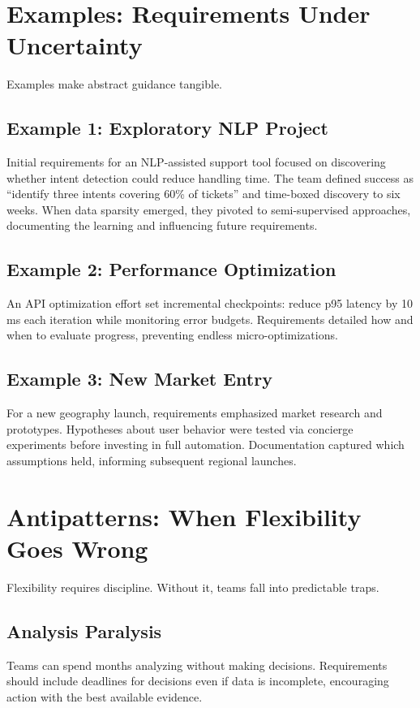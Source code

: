 \section{Examples: Requirements Under Uncertainty}
\label{sec:uncertainty-examples}

Examples make abstract guidance tangible.

\subsection{Example 1: Exploratory NLP Project}
Initial requirements for an NLP-assisted support tool focused on discovering whether intent detection could reduce handling time. The team defined success as ``identify three intents covering 60\% of tickets'' and time-boxed discovery to six weeks. When data sparsity emerged, they pivoted to semi-supervised approaches, documenting the learning and influencing future requirements.

\subsection{Example 2: Performance Optimization}
An API optimization effort set incremental checkpoints: reduce p95 latency by 10\,ms each iteration while monitoring error budgets. Requirements detailed how and when to evaluate progress, preventing endless micro-optimizations.

\subsection{Example 3: New Market Entry}
For a new geography launch, requirements emphasized market research and prototypes. Hypotheses about user behavior were tested via concierge experiments before investing in full automation. Documentation captured which assumptions held, informing subsequent regional launches.

\section{Antipatterns: When Flexibility Goes Wrong}
\label{sec:flexibility-antipatterns}

Flexibility requires discipline. Without it, teams fall into predictable traps.

\subsection{Analysis Paralysis}
Teams can spend months analyzing without making decisions. Requirements should include deadlines for decisions even if data is incomplete, encouraging action with the best available evidence.

